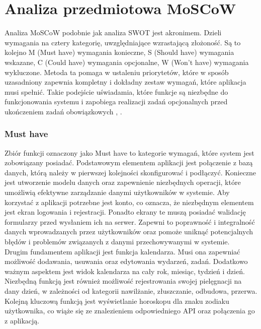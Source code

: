 \section{Analiza przedmiotowa MoSCoW}
\phantom{Th}
Analiza MoSCoW podobnie jak analiza SWOT jest akronimem. Dzieli wymagania na cztery kategorię, uwzględniające wzrastającą złożoność. 
Są to kolejno M (Must have) wymagania konieczne, S (Should have) wymagania wskazane, C (Could have) wymagania opcjonalne, 
W (Won't have) wymagania wykluczone. Metoda ta pomaga w ustaleniu priorytetów, które w sposób uzasadniony zapewnia kompletny 
i dokładny zestaw wymagań, które aplikacja musi spełnić. Takie podejście uświadamia, które funkcje są niezbędne do funkcjonowania systemu 
i zapobiega realizacji zadań opcjonalnych przed ukończeniem zadań obowiązkowych \cite{moscow} , \cite{businessanalysis}. 

\subsubsection*{\textbf{Must have}}
\phantom{Th}
Zbiór funkcji oznaczony jako Must have to kategorie wymagań, które system jest zobowiązany posiadać. 
Podstawowym elementem aplikacji jest połączenie z bazą danych, którą należy w pierwszej kolejności skonfigurować
i podłączyć. Konieczne jest utworzenie modelu danych oraz zapewnienie niezbędnych operacji, 
które umożliwią efektywne zarządzanie danymi użytkowników w systemie. Aby korzystać z aplikacji potrzebne jest konto, 
co oznacza, że niezbędnym elementem jest ekran logowania i rejestracji. 
Ponadto ekrany te muszą posiadać walidację formularzy przed wysłaniem ich na serwer. Zapewni to poprawność 
i integralność danych wprowadzanych przez użytkowników oraz pomoże uniknąć potencjalnych błędów 
i problemów związanych z danymi przechowywanymi w systemie.\\

Drugim fundamentem aplikacji jest funkcja kalendarza. Musi ona zapewniać możliwość dodawania, usuwania oraz edytowania wydarzeń, zadań. 
Dodatkowo ważnym aspektem jest widok kalendarza na cały rok, miesiąc, tydzień i dzień. 
Niezbędną funkcją jest również możliwość rejestrowania swojej pielęgnacji na dany dzień, w zależności od kategorii nawilżanie, 
złuszczanie, odbudowa, przerwa. Kolejną kluczową funkcją jest wyświetlanie horoskopu dla znaku zodiaku użytkownika, 
co wiąże się ze znalezieniem odpowiedniego API oraz połączenia go z aplikacją.


